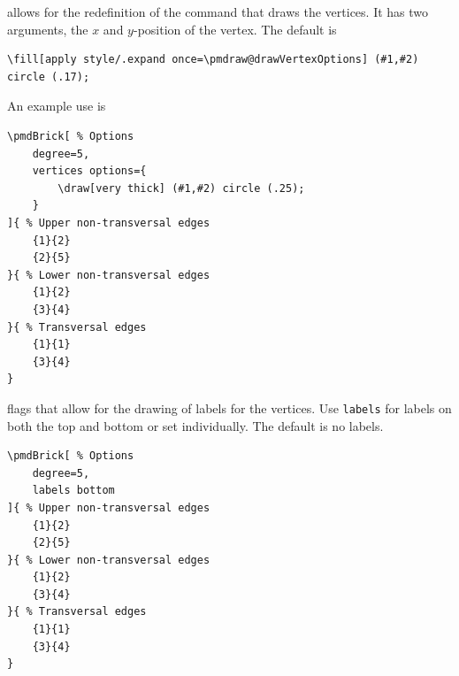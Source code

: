 \documentclass{ltxdoc}
\begin{document}
allows for the redefinition of the command that draws the vertices. It has two arguments, the \( x \) and \( y \)-position of the vertex. The default is
\begin{verbatim}
\fill[apply style/.expand once=\pmdraw@drawVertexOptions] (#1,#2) circle (.17);
\end{verbatim}
An example use is
\begin{center}
    \begin{minipage}{\dimexpr0.85\textwidth-2\fboxrule-2\fboxsep\relax}
        \begin{minipage}[c]{0.4\linewidth}
\begin{verbatim}
\pmdBrick[ % Options
    degree=5,
    vertices options={
        \draw[very thick] (#1,#2) circle (.25);
    }
]{ % Upper non-transversal edges
    {1}{2}
    {2}{5}
}{ % Lower non-transversal edges
    {1}{2}
    {3}{4}
}{ % Transversal edges
    {1}{1}
    {3}{4}
}
\end{verbatim}
        \end{minipage}
        \hfill
        \begin{minipage}[c]{0.4\linewidth}
        \end{minipage}
    \end{minipage}%
\end{center}
\begin{center}
\end{center}

flags that allow for the drawing of labels for the vertices. Use \texttt{labels} for labels on both the top and bottom or set individually. The default is no labels.
\begin{center}
    \begin{minipage}{\dimexpr0.85\textwidth-2\fboxrule-2\fboxsep\relax}
        \begin{minipage}[c]{0.4\linewidth}
\begin{verbatim}
\pmdBrick[ % Options
    degree=5,
    labels bottom
]{ % Upper non-transversal edges
    {1}{2}
    {2}{5}
}{ % Lower non-transversal edges
    {1}{2}
    {3}{4}
}{ % Transversal edges
    {1}{1}
    {3}{4}
}
\end{verbatim}
        \end{minipage}
        \hfill
        \begin{minipage}[c]{0.4\linewidth}
        \end{minipage}
    \end{minipage}%
\end{center}
\end{document}
